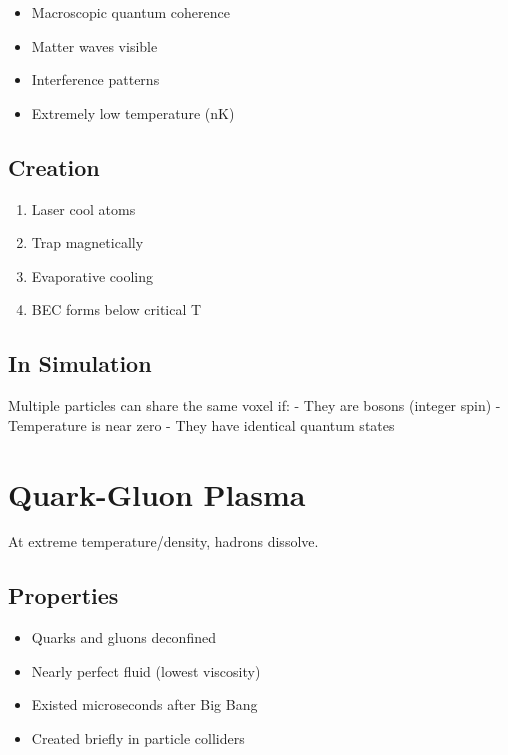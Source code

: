 \documentclass[
  11pt,
  letterpaper,
  twoside,
  openright]{book}
\providecommand{\tightlist}{%
  \setlength{\itemsep}{0pt}\setlength{\parskip}{0pt}}
\begin{document}
\begin{itemize}
\tightlist
\item
  Macroscopic quantum coherence
\item
  Matter waves visible
\item
  Interference patterns
\item
  Extremely low temperature (nK)
\end{itemize}

\subsection{Creation}\label{creation}

\begin{enumerate}
\def\labelenumi{\arabic{enumi}.}
\tightlist
\item
  Laser cool atoms
\item
  Trap magnetically
\item
  Evaporative cooling
\item
  BEC forms below critical T
\end{enumerate}

\subsection{In Simulation}\label{in-simulation-2}

Multiple particles can share the same voxel if: - They are bosons
(integer spin) - Temperature is near zero - They have identical quantum
states

\section{Quark-Gluon Plasma}\label{quark-gluon-plasma}

At extreme temperature/density, hadrons dissolve.

\subsection{Properties}\label{properties-8}

\begin{itemize}
\tightlist
\item
  Quarks and gluons deconfined
\item
  Nearly perfect fluid (lowest viscosity)
\item
  Existed microseconds after Big Bang
\item
  Created briefly in particle colliders
\end{itemize}
\end{document}
